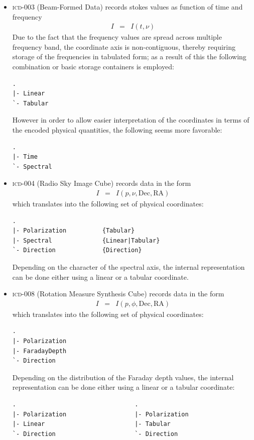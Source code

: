 \documentclass[a4paper,10pt,bibtotoc]{scrreprt}
\begin{document}
\begin{itemize}
\item \textsc{icd-003} (Beam-Formed Data) records stokes values as
  function of time and frequency
  \begin{eqnarray*}
    I & = & I (t,\nu)
  \end{eqnarray*}
  Due to the fact that the frequency values are spread across multiple
  frequency band, the coordinate axis is non-contiguous, thereby
  requiring storage of the frequencies in tabulated form; as a result
  of this the following combination or basic storage containers is employed:
\begin{lstlisting}
.
|- Linear
`- Tabular
\end{lstlisting}
However in order to allow easier interpretation of the coordinates in
terms of the encoded physical quantities, the following seems more favorable:
\begin{lstlisting}
.
|- Time
`- Spectral
\end{lstlisting}
  
\item \textsc{icd-004} (Radio Sky Image Cube) records data in the form
  \begin{eqnarray*}
    I & = & I (p,\nu,\mathrm{Dec},\mathrm{RA})
  \end{eqnarray*}
which translates into the following set of physical coordinates:
\begin{lstlisting}
.
|- Polarization          {Tabular}
|- Spectral              {Linear|Tabular}
`- Direction             {Direction}
\end{lstlisting}
Depending on the character of the spectral axis, the internal
representation can be done either using a linear or a tabular coordinate.

\item \textsc{icd-008} (Rotation Measure Synthesis Cube) records data
  in the form
  \begin{eqnarray*}
    I & = & I (p, \phi, \mathrm{Dec}, \mathrm{RA})
  \end{eqnarray*}
which translates into the following set of physical coordinates:
\begin{lstlisting}
.
|- Polarization
|- FaradayDepth
`- Direction
\end{lstlisting}
Depending on the distribution of the Faraday depth values, the
internal representation can be done either using a linear or a tabular coordinate:
\begin{lstlisting}
.                                 .
|- Polarization                   |- Polarization
|- Linear                         |- Tabular
`- Direction                      `- Direction
\end{lstlisting}


\end{itemize}
\end{document}
